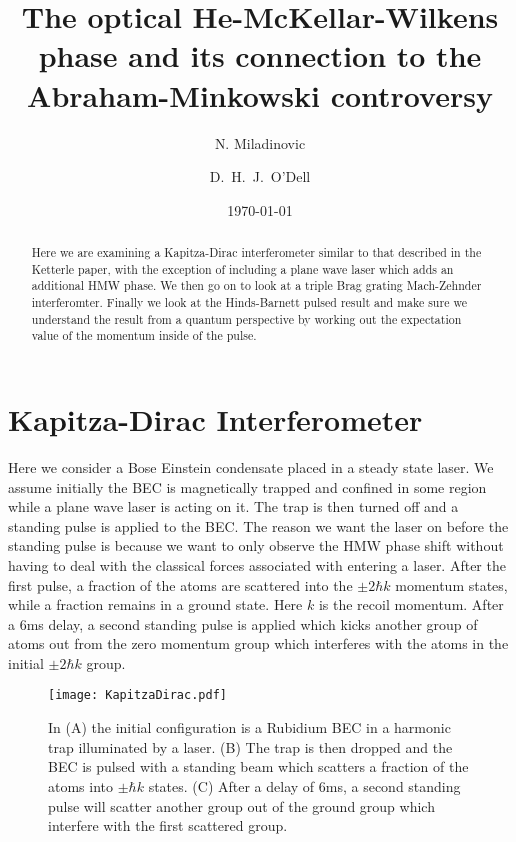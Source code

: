 \documentclass[twocolumn,english,pra,aps,superscriptaddress,floatfix]{revtex4-1}
\begin{document}
\author{N. Miladinovic}
\author{D.\ H.\ J.\ O'Dell}

\title{The optical He-McKellar-Wilkens phase and its connection to the Abraham-Minkowski controversy}
\date{\today}

\begin{abstract}
\label{sec:abstract}
Here we are examining a Kapitza-Dirac interferometer similar to that described in the Ketterle paper, with the exception of including a plane wave laser which adds an additional HMW phase.  We then go on to look at a triple Brag grating Mach-Zehnder interferomter. Finally we look at the Hinds-Barnett pulsed result and make sure we understand the result from a quantum perspective by working out the expectation value of the momentum inside of the pulse.
\end{abstract}

\maketitle

\section{Kapitza-Dirac Interferometer}
\label{sec:kaptiza}

Here we consider a Bose Einstein condensate placed in a steady state laser.  We assume initially the BEC is magnetically trapped and confined in some region while a plane wave laser is acting on it.  The trap is then turned off and a standing pulse is applied to the BEC.  The reason we want the laser on before the standing pulse is because we want to only observe the HMW phase shift without having to deal with the classical forces associated with entering a laser.
After the first pulse, a fraction of the atoms are scattered into the $\pm 2\hbar k$ momentum states, while a fraction remains in a ground state. Here $k$ is the recoil momentum. After a $6$ms delay, a second standing pulse is applied which kicks another group of atoms out from the zero momentum group which interferes with the atoms in the initial $\pm 2\hbar k$ group. 
\begin{figure}
\texttt{[image: KapitzaDirac.pdf]}
\caption{In (A) the initial configuration is a Rubidium BEC in a harmonic trap illuminated by a laser. (B) The trap is then dropped and the BEC is pulsed with a standing beam which scatters a fraction of the atoms into $\pm \hbar k$ states.  (C) After a delay of $6$ms, a second standing pulse will scatter another group out of the ground group which interfere with the first scattered group.} 
\label{fig:kapitz}
\end{figure}
\end{document}
